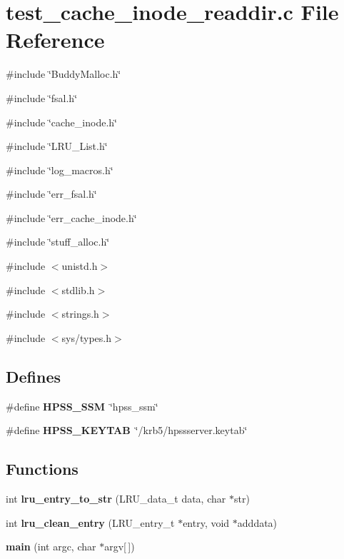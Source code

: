 \section{test\_\-cache\_\-inode\_\-readdir.c File Reference}
\label{test__cache__inode__readdir_8c}
{\ttfamily \#include \char`\"{}BuddyMalloc.h\char`\"{}}\par
{\ttfamily \#include \char`\"{}fsal.h\char`\"{}}\par
{\ttfamily \#include \char`\"{}cache\_\-inode.h\char`\"{}}\par
{\ttfamily \#include \char`\"{}LRU\_\-List.h\char`\"{}}\par
{\ttfamily \#include \char`\"{}log\_\-macros.h\char`\"{}}\par
{\ttfamily \#include \char`\"{}err\_\-fsal.h\char`\"{}}\par
{\ttfamily \#include \char`\"{}err\_\-cache\_\-inode.h\char`\"{}}\par
{\ttfamily \#include \char`\"{}stuff\_\-alloc.h\char`\"{}}\par
{\ttfamily \#include $<$unistd.h$>$}\par
{\ttfamily \#include $<$stdlib.h$>$}\par
{\ttfamily \#include $<$strings.h$>$}\par
{\ttfamily \#include $<$sys/types.h$>$}\par
\subsection*{Defines}
\begin{DoxyCompactItemize}
\item 
\#define {\bf HPSS\_\-SSM}~\char`\"{}hpss\_\-ssm\char`\"{}
\item 
\#define {\bf HPSS\_\-KEYTAB}~\char`\"{}/krb5/hpssserver.keytab\char`\"{}
\end{DoxyCompactItemize}
\subsection*{Functions}
\begin{DoxyCompactItemize}
\item 
int {\bf lru\_\-entry\_\-to\_\-str} (LRU\_\-data\_\-t data, char $\ast$str)
\item 
int {\bf lru\_\-clean\_\-entry} (LRU\_\-entry\_\-t $\ast$entry, void $\ast$adddata)
\item 
{\bf main} (int argc, char $\ast$argv[$\,$])
\end{DoxyCompactItemize}


